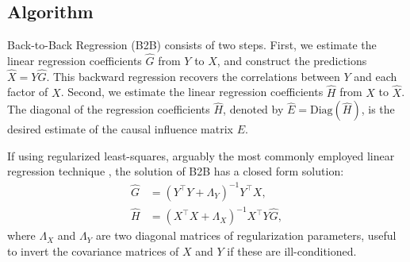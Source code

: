 \documentclass{article}
\begin{document}




\subsection{Algorithm}


Back-to-Back Regression (B2B) consists of two steps.
%
First, we estimate the linear regression coefficients $\hat G$ from $Y$ to $X$, and construct the predictions $\hat X = Y \hat G$.
%
This backward regression recovers the correlations between $Y$ and each factor of $X$.
%
Second, we estimate the linear regression coefficients $\hat H$ from $X$ to $\hat X$.
%
The diagonal of the regression coefficients $\hat H$, denoted by $\hat{E} = \text{Diag}(\hat{H})$, is the desired estimate of the causal influence matrix $E$.

If using regularized least-squares, arguably the most commonly employed linear regression technique \citep{hoerl1959optimum, rifkin2007notes}, the solution of B2B has a closed form solution:
\begin{align}
    \hat G &= (Y^\top Y + \Lambda_Y)^{-1} Y^\top X,\label{eq:solG}\\
    \hat H &=(X^\top X + \Lambda_X)^{-1} X^\top Y \hat G,\label{eq:solH}
\end{align}
%
where $\Lambda_X$ and $\Lambda_Y$ are two diagonal matrices of regularization parameters, useful to invert the covariance matrices of $X$ and $Y$ if these are ill-conditioned.


\end{document}

